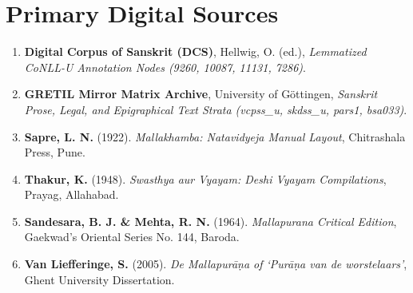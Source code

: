 \documentclass[11pt,letterpaper]{article}
\begin{document}
\section*{Primary Digital Sources}
\begin{enumerate}
    \item \textbf{Digital Corpus of Sanskrit (DCS)}, Hellwig, O. (ed.), \textit{Lemmatized CoNLL-U Annotation Nodes (9260, 10087, 11131, 7286)}.
    \item \textbf{GRETIL Mirror Matrix Archive}, University of Göttingen, \textit{Sanskrit Prose, Legal, and Epigraphical Text Strata (vcpss\_u, skdss\_u, pars1, bsa033)}.
    \item \textbf{Sapre, L. N.} (1922). \textit{Mallakhamba: Natavidyeja Manual Layout}, Chitrashala Press, Pune.
    \item \textbf{Thakur, K.} (1948). \textit{Swasthya aur Vyayam: Deshi Vyayam Compilations}, Prayag, Allahabad.
    \item \textbf{Sandesara, B. J. \& Mehta, R. N.} (1964). \textit{Mallapurana Critical Edition}, Gaekwad's Oriental Series No. 144, Baroda.
    \item \textbf{Van Liefferinge, S.} (2005). \textit{De Mallapurāṇa of ‘Purāṇa van de worstelaars’}, Ghent University Dissertation.
\end{enumerate}
\end{document}
